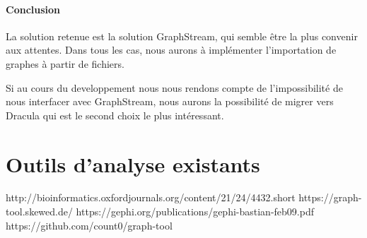   \paragraph{Conclusion}
  La solution retenue est la solution GraphStream, qui semble être la plus convenir aux attentes. Dans tous les cas, nous aurons à implémenter l'importation de graphes à partir de fichiers.
  
  Si au cours du developpement nous nous rendons compte de l'impossibilité de nous interfacer avec GraphStream, nous aurons la possibilité de migrer vers Dracula qui est le second choix le plus intéressant.
  

  \section{Outils d'analyse existants}

  http://bioinformatics.oxfordjournals.org/content/21/24/4432.short
  https://graph-tool.skewed.de/
  https://gephi.org/publications/gephi-bastian-feb09.pdf
  https://github.com/count0/graph-tool
  